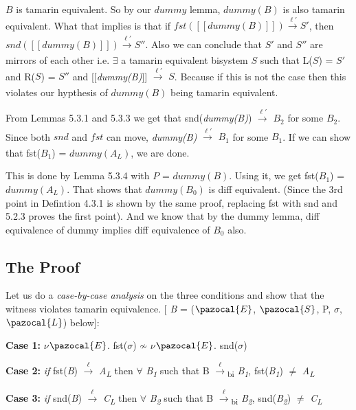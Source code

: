 \documentclass[11pt]{article}
\newcommand{\Sa}{\pazocal{S}}
\newcommand{\Lb}{\pazocal{L}}
\newcommand{\Ea}{\pazocal{E}}
\begin{document}
$B$ is tamarin equivalent. So by our $dummy$ lemma, $dummy(B)$ is also tamarin equivalent. What that implies is that if $fst([[dummy(B)]]) \xrightarrow[\text{}]{\text{$\ell'$}} S'$, then $snd([[dummy(B)]]) \xrightarrow[\text{}]{\text{$\ell'$}} S''$. Also we can conclude that $S'$ and $S''$ are mirrors of each other i.e. $\exists$ a tamarin equivalent bisystem $S$ such that L($S$) = $S'$ and R($S$) = $S''$ and [[{\it dummy(B)}]] {$\xrightarrow[\text{}]{\text{$\ell'$}}$} {\it $S$}. Because if this is not the case then this violates our hypthesis of $dummy(B)$ being tamarin equivalent.

From Lemmas 5.3.1 and 5.3.3 we get that snd({\it dummy(B)}) {$\xrightarrow[\text{}]{\text{$\ell'$}}$} {\it $B_2$} for some $B_2$. Since both $snd$ and $fst$ can move, {\it dummy(B)} {$\xrightarrow[\text{}]{\text{$\ell'$}}$} {\it $B_1$} for some $B_1$. If we can show that fst($B_1$) = $dummy(A_L)$, we are done. 

This is done by Lemma 5.3.4 with $P$ = $dummy(B)$. Using it, we get fst($B_1$) = $dummy(A_L)$. That shows that $dummy(B_0)$ is diff equivalent. (Since the 3rd point in Defintion 4.3.1 is shown by the same proof, replacing fst with snd and 5.2.3 proves the first point). And we know that by the dummy lemma, diff equivalence of dummy implies diff equivalence of $B_0$ also.



\pagebreak

\subsection{The Proof}
Let us do a {\it case-by-case analysis} on the three conditions and show that the witness violates tamarin equivalence. [ {\it B} = ($\Ea$, $\Sa$, P, $\sigma$, $\Lb$) below]: \newline

{\bf Case 1: }$\nu$$\Ea$. fst($\sigma$) $\not\sim$ $\nu$$\Ea$. snd($\sigma$)\newline

{\bf Case 2: }{\it if} fst({\it B}) {$\xrightarrow[\text{}]{\text{$\ell$}}$} {\it A}\textsubscript{{\it L}} then {$\forall$} {\it B\textsubscript{1}} such that 
  B {$\xrightarrow[\text{}]{\text{$\ell$}}$}{\textsubscript{bi}} {\it B\textsubscript{1}}, fst({\it B\textsubscript{1}}) $\neq$ {\it A}\textsubscript{{\it L}}\newline

{\bf Case 3: }{\it if} snd({\it B}) {$\xrightarrow[\text{}]{\text{$\ell$}}$} {\it C}\textsubscript{{\it L}} then {$\forall$} {\it B\textsubscript{2}} such that 
  B {$\xrightarrow[\text{}]{\text{$\ell$}}$}{\textsubscript{bi}} {\it B\textsubscript{2}}, snd({\it B\textsubscript{2}}) $\neq$ {\it C}\textsubscript{{\it L}}\newline
\end{document}
